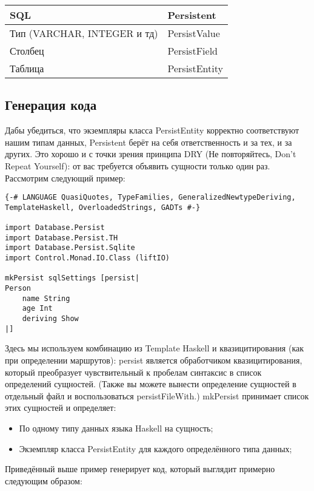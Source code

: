\begin{center}
\begin{tabular}{ | l | l |}
\hline
SQL	& Persistent \\ \hline
Тип (VARCHAR, INTEGER и тд)	& PersistValue \\ \hline
Столбец & PersistField \\ \hline
Таблица	& PersistEntity \\ \hline
\end{tabular}
\end{center}

\subsection{Генерация кода}

Дабы убедиться, что экземпляры класса PersistEntity корректно соответствуют нашим типам данных, Persistent берёт на себя ответственность и за тех, и за других. Это хорошо и с точки зрения принципа DRY (Не повторяйтесь, Don't Repeat Yourself): от вас требуется объявить сущности только один раз. Рассмотрим следующий пример:

\begin{lstlisting}
{-# LANGUAGE QuasiQuotes, TypeFamilies, GeneralizedNewtypeDeriving, TemplateHaskell, OverloadedStrings, GADTs #-}

import Database.Persist
import Database.Persist.TH
import Database.Persist.Sqlite
import Control.Monad.IO.Class (liftIO)

mkPersist sqlSettings [persist|
Person
    name String
    age Int
    deriving Show
|]
\end{lstlisting}

Здесь мы используем комбинацию из Template Haskell и квазицитирования (как при
определении маршрутов): persist является обработчиком квазицитирования, который
преобразует чувствительный к пробелам синтаксис в список определений сущностей.
(Также вы можете вынести определение сущностей в отдельный файл и
воспользоваться persistFileWith.) mkPersist принимает список этих сущностей и определяет:

\begin{itemize}
  \item По одному типу данных языка Haskell на сущность;
  \item Экземпляр класса PersistEntity для каждого определённого типа данных;
\end{itemize}

Приведённый выше пример генерирует код, который выглядит примерно следующим образом:

